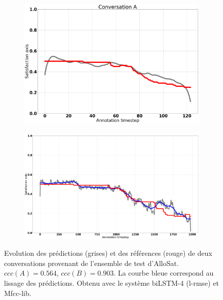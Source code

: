\begin{figure}[h]
        \centering
        \begin{subfigure}{.49\textwidth}
          \centering
          \includegraphics[width=.99\linewidth]{./Chapitre5/figures/cccVSrmse1.png}
        \end{subfigure}
        \begin{subfigure}{.49\textwidth}
          \centering
          \includegraphics[width=.99\linewidth]{./Chapitre5/figures/lissage2.png}
        \end{subfigure}
        \caption{Evolution des prédictions (grises) et des références (rouge) de deux conversations provenant de l'ensemble de test d'AlloSat. $ccc(A) = 0.564$, $ccc(B) = 0.903$. La courbe bleue correspond au lissage des prédictions. Obtenu avec le système biLSTM-4 (l-rmse) et Mfcc-lib.}
        \label{fig:cccVSrmse}
    \end{figure}
